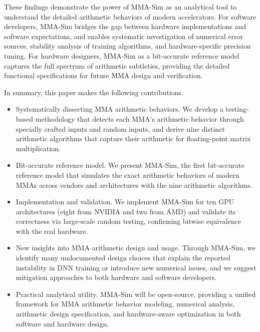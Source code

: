 These findings demonstrate the power of MMA-Sim as an analytical tool to understand the detailed arithmetic behaviors of modern accelerators. For software developers, MMA-Sim bridges the gap between hardware implementations and software expectations, and enables systematic investigation of numerical error sources, stability analysis of training algorithms, and hardware-specific precision tuning. For hardware designers, MMA-Sim as a bit-accurate reference model captures the full spectrum of arithmetic subtleties, providing the detailed functional specifications for future MMA design and verification.


In summary, this paper makes the following contributions.

\begin{itemize}
\item Systematically dissecting MMA arithmetic behaviors. We develop a testing-based methodology that detects each MMA’s arithmetic behavior through specially crafted inputs and random inputs, and derive nine distinct arithmetic algorithms that capture their arithmetic for floating-point matrix multiplication.
\item Bit-accurate reference model. We present MMA-Sim, the first bit-accurate reference model that simulates the exact arithmetic behaviors of modern MMAs across vendors and architectures with the nine arithmetic algorithms.
\item Implementation and validation. We implement MMA-Sim for ten GPU architectures (eight from NVIDIA and two from AMD) and validate its correctness via large-scale random testing, confirming bitwise equivalence with the real hardware.
\item New insights into MMA arithmetic design and usage. Through MMA-Sim, we identify many undocumented design choices that explain the reported instability in DNN training or introduce new numerical issues, and we suggest mitigation approaches to both hardware and software developers.
\item Practical analytical utility. MMA-Sim will be open-source, providing a unified framework for MMA arithmetic behavior modeling, numerical analysis, arithmetic design specification, and hardware-aware optimization in both software and hardware design.
\end{itemize}
